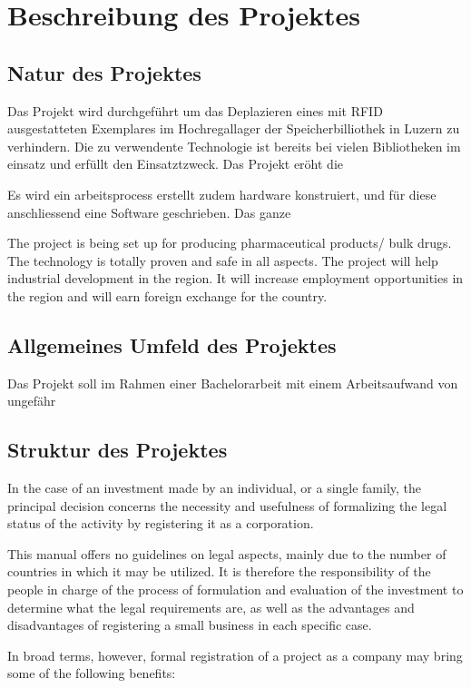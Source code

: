 \chapter{Beschreibung des Projektes}

\section{Natur des Projektes}
Das Projekt wird durchgeführt um das Deplazieren eines mit RFID ausgestatteten Exemplares im Hochregallager der Speicherbilliothek in Luzern zu verhindern. Die zu verwendente Technologie ist bereits bei vielen Bibliotheken im einsatz und erfüllt den Einsatztzweck.
Das Projekt eröht die 

Es wird ein arbeitsprocess erstellt
zudem hardware konstruiert, und für diese anschliessend eine Software geschrieben. Das ganze 


The project is  being  set  up  for  producing pharmaceutical  products/  bulk  drugs. The technology  is  totally  proven  and  safe  in  all  aspects.  The  project  will  help  industrial development in the region. It will increase employment opportunities in the region and will earn foreign exchange for the country.

\section{Allgemeines Umfeld des Projektes}
Das Projekt soll im Rahmen einer Bachelorarbeit mit einem Arbeitsaufwand von ungefähr 

\section{Struktur des Projektes}

In the case of an investment made by an individual, or a single family, the principal decision concerns the necessity and usefulness of formalizing the legal status of the activity by registering it as a corporation.

This manual offers no guidelines on legal aspects, mainly due to the number of countries in which it may be utilized. It is therefore the responsibility of the people in charge of the process of formulation and evaluation of the investment to determine what the legal requirements are, as well as the advantages and disadvantages of registering a small business in each specific case.

In broad terms, however, formal registration of a project as a company may bring some of the following benefits:

